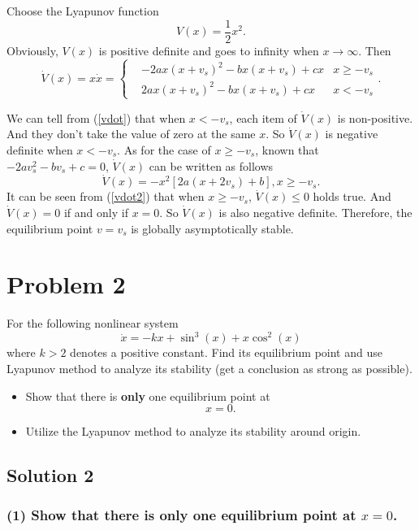 \documentclass[12pt,a4paper]{article}
\begin{document}
\indent Choose the Lyapunov function
\begin{equation}
V(x)=\frac{1}{2}x^2.
\end{equation}
Obviously, $V(x)$ is positive definite and goes to infinity when $x\rightarrow\infty$. Then
\begin{equation}
\dot{V}(x)=x\dot{x}=
\left\{
    \begin{aligned}
    &-2ax(x+v_s)^2-bx(x+v_s)+cx &x\ge -v_s\\
    &2ax(x+v_s)^2-bx(x+v_s)+cx &x<-v_s
    \end{aligned}
\right. .
\label{vdot}
\end{equation}

\indent We can tell from (\ref{vdot}) that when $x<-v_s$, each item of $\dot{V}(x)$ is non-positive. And they don't take the value of zero at the same $x$. So $\dot{V}(x)$ is negative definite when $x<-v_s$. As for the case of $x\ge -v_s$, known that $-2av_s^2-bv_s+c=0$, $\dot{V}(x)$ can be written as follows
\begin{equation}
\dot{V}(x)=-x^2[2a(x+2v_s)+b], x\ge -v_s.
\label{vdot2}
\end{equation}
It can be seen from (\ref{vdot2}) that when $x\ge -v_s$, $\dot{V}(x)\le 0$ holds true. And $\dot{V}(x)=0$ if and only if $x=0$. So $\dot{V}(x)$ is also negative definite. Therefore, the equilibrium point $v=v_s$ is globally asymptotically stable.

\section*{Problem 2}

\indent For the following nonlinear system
$$\dot{x}=-kx+\sin^3(x)+x\cos^2(x)$$
where $k>2$ denotes a positive constant. Find its equilibrium point and use Lyapunov method to analyze its stability (get a conclusion as strong as possible).

\begin{itemize}
    \item Show that there is {\bf only} one equilibrium point at
        $$x=0.$$
    \item Utilize the Lyapunov method to analyze its stability around origin.
\end{itemize}

\subsection*{Solution 2}

\subsubsection*{(1) Show that there is {\bf only} one equilibrium point at $x=0$.}
\end{document}
